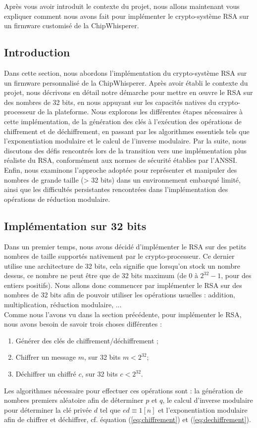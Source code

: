Après vous avoir introduit le contexte du projet, nous allons maintenant vous expliquer comment nous avons fait pour implémenter le crypto-système RSA sur un firmware customisé de la ChipWhisperer.

\subsection{Introduction}
Dans cette section, nous abordons l'implémentation du crypto-système RSA sur un firmware personnalisé de la ChipWhisperer. Après avoir établi le contexte du projet, nous décrivons en détail notre démarche pour mettre en œuvre le RSA sur des nombres de 32 bits, en nous appuyant sur les capacités natives du crypto-processeur de la plateforme. Nous explorons les différentes étapes nécessaires à cette implémentation, de la génération des clés à l'exécution des opérations de chiffrement et de déchiffrement, en passant par les algorithmes essentiels tels que l'exponentiation modulaire et le calcul de l'inverse modulaire. Par la suite, nous discutons des défis rencontrés lors de la transition vers une implémentation plus réaliste du RSA, conformément aux normes de sécurité établies par l'ANSSI. Enfin, nous examinons l'approche adoptée pour représenter et manipuler des nombres de grande taille (> 32 bits) dans un environnement embarqué limité, ainsi que les difficultés persistantes rencontrées dans l'implémentation des opérations de réduction modulaire.

\subsection{Implémentation sur 32 bits}
Dans un premier temps, nous avons décidé d'implémenter le RSA sur des petits nombres de taille supportés nativement par le crypto-processeur. Ce dernier utilise une architecture de 32 bits, cela signifie que lorsqu'on stock un nombre dessus, ce nombre ne peut être que de 32 bits maximum (de $0$ à $2^{32} - 1$, pour des entiers positifs). Nous allons donc commencer par implémenter le RSA sur des nombres de 32 bits afin de pouvoir utiliser les opérations usuelles : addition, multiplication, réduction modulaire, ...\\

Comme nous l'avons vu dans la section précédente, pour implémenter le RSA, nous avons besoin de savoir trois choses différentes :
\begin{enumerate}
	\item Générer des clés de chiffrement/déchiffrement ;
	\item Chiffrer un message $m$, sur 32 bits $m < 2^{32}$;
	\item Déchiffrer un chiffré $c$, sur 32 bits $c < 2^{32}$.
\end{enumerate}
\medskip
Les algorithmes nécessaire pour effectuer ces opérations sont : la génération de nombres premiers aléatoire afin de déterminer $p$ et $q$, le calcul d'inverse modulaire pour déterminer la clé privée $d$ tel que $ed \equiv 1 [n]$ et l'exponentiation modulaire afin de chiffrer et déchiffrer, cf. équation (\ref{eq:chiffrement}) et (\ref{eq:dechiffrement}).\\

